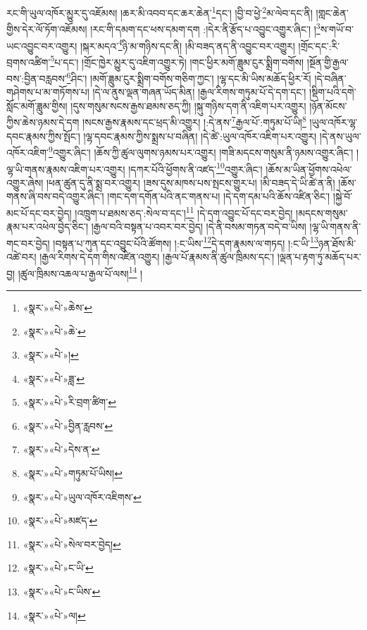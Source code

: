 རང་གི་ཡུལ་འཁོར་མྱུར་དུ་འཇོམས། །ཆར་མི་འབབ་དང་ཆར་ཆེན་\footnote{«སྣར་»«པེ་»ཆེས་}དང་། །བྱི་བ་ཕྱེ་\footnote{«སྣར་»«པེ་»ཆེ་}མ་ལེབ་དང་ནི། །གླང་ཆེན་གྱིས་དེར་ལོ་ཏོག་འཇོམས། །རང་གི་དམག་དང་ཕས་དམག་དག :།དེར་ནི་རྩོད་པ་འབྱུང་འགྱུར་ཞིང་། །\footnote{«སྣར་»«པེ་»།}ས་གཡོ་བ་ཡང་འབྱུང་བར་འགྱུར། །སྐར་མདའ་\footnote{«སྣར་»«པེ་»ཟླ་}ཉི་མ་གཉིས་དང་ནི། །མི་བཟད་ནད་ནི་འབྱུང་བར་འགྱུར། །གྲོང་དང་:རི་བྲགས་འཚིག་\footnote{«སྣར་»«པེ་»རི་བྲག་ཚིག་}པ་དང་། །གྲོང་ཁྱེར་མྱུར་དུ་འཇིག་འགྱུར་ཏེ། །གང་ཕྱིར་མགོ་ཟླུམ་ངུར་སྨྲིག་བགོས། །སྔོན་གྱི་རྒྱལ་བས་:བྱིན་བརླབས་\footnote{«སྣར་»«པེ་»བྱིན་རླབས་}ཤིང་། །མགོ་ཟླུམ་ངུར་སྨྲིག་བགོས་གཅིག་ཀྱང་། །ལྷ་དང་མི་ཡིས་མཆོད་ཕྱིར་རོ། །དེ་བཞིན་གཤེགས་པ་མ་གཏོགས་པ། །དེ་ལ་ནུས་ལྡན་གཞན་ཡོད་མིན། །རྒྱལ་རིགས་གཏུམ་པོ་དེ་དག་དང་། །སྡིག་པའི་དགེ་སློང་མགོ་ཟླུམ་གྱིས། །དུས་གསུམ་སངས་རྒྱས་ཐམས་ཅད་ཀྱི། །སྐུ་གཉིས་དག་ནི་འཇིག་པར་འགྱུར། །ཉོན་མོངས་ཀྱིས་ཆེས་ཉམས་དེ་དག །སངས་རྒྱས་རྣམས་དང་ཕྲད་མི་འགྱུར། །:དེ་ནས་\footnote{«སྣར་»«པེ་»དེས་ན་}རྒྱལ་པོ་:གཏུམ་པོ་ཡི།\footnote{«སྣར་»«པེ་»གཏུམ་པོ་ཡིས།} །ཡུལ་འཁོར་ལྷ་དབང་རྣམས་ཀྱིས་སྤོང་། །ལྷ་དབང་རྣམས་ཀྱིས་སྨྲས་པ་བཞིན། །དེ་ཚེ་:ཡུལ་འཁོར་འཇིག་པར་འགྱུར། །དེ་ནས་ཡུལ་འཁོར་འཇིག་\footnote{«སྣར་»«པེ་»ཡུལ་འཁོར་འཇིགས་}འགྱུར་ཞིང་། །ཆོས་ཀྱི་ཚུལ་ལུགས་ཉམས་པར་འགྱུར། །གཟི་མདངས་གསུམ་ནི་ཉམས་འགྱུར་ཞིང་། །ལྷ་ཡི་གནས་རྣམས་འཇིག་པར་འགྱུར། །དཀར་པོའི་ཕྱོགས་ནི་འཛད་\footnote{«སྣར་»«པེ་»མཛད་}འགྱུར་ཞིང་། །ཆོས་མ་ཡིན་ཕྱོགས་འཕེལ་འགྱུར་ཞེས། །ཕན་ཚུན་དུ་ནི་སྨྲ་བར་འགྱུར། །ཟས་དུས་མཁས་པས་སྤངས་གྱུར་པ། །མི་བཟད་དེ་ཡི་ཚེ་ན་ནི། །ཆོས་གནས་ཞི་བས་བདེ་འགྱུར་ཞིང་། །གང་དག་དགོན་པའི་ནང་གནས་པ། །དེ་དག་དམ་པའི་ཆོས་འཛིན་ཅིང་། །སྐྱེ་བོ་མང་པོ་དང་བར་བྱེད། །འཁྲུག་པ་ཐམས་ཅད་:སེལ་བ་དང་།\footnote{«སྣར་»«པེ་»སེལ་བར་བྱེད།} །དེ་དག་འབྱུང་པོ་དང་བར་བྱེད། །མདངས་གསུམ་རྣམ་པར་འཕེལ་བྱེད་ཅིང་། །རྒྱལ་བའི་བསྟན་པ་འབར་བར་བྱེད། །དེ་ནི་བསམ་གཏན་བདེ་བ་ཡིས། །ལྷ་ཡི་གནས་ནི་གང་བར་བྱེད། །བསྟན་པ་ཀུན་དང་འབྱུང་པོའི་ཚོགས། །:ང་ཡིས་\footnote{«སྣར་»«པེ་»ང་ཡི་}དེ་དག་རྣམས་ལ་གཏད། །:ང་ཡི་\footnote{«སྣར་»«པེ་»ང་ཡིས་}ཉན་ཐོས་མི་འཚེ་བར། །རྒྱལ་རིགས་དེ་དག་གིས་འཛིན་འགྱུར། །རྒྱལ་པོ་རྣམས་ནི་ཚུལ་ཁྲིམས་དང་། །ལྡན་པ་རྟག་ཏུ་མཆོད་པར་བྱ། །ཚུལ་ཁྲིམས་འཆལ་པ་རྒྱལ་པོ་ལས།\footnote{«སྣར་»«པེ་»ལ།} །

